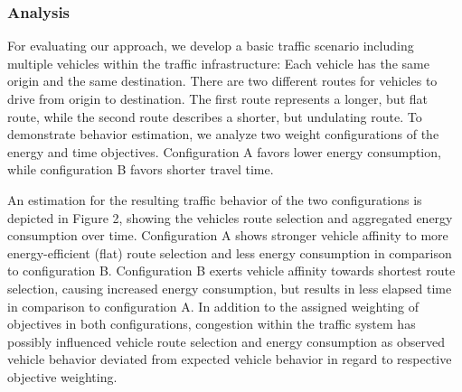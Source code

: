 \documentclass[conference]{../cls/IEEEtran}
\begin{document}
\subsubsection*{Analysis}

For evaluating our approach, we develop a basic traffic scenario
including multiple vehicles within the traffic infrastructure: Each vehicle has
the same origin and the same destination. There are two different
routes for vehicles to drive from origin to destination. The first route
represents a longer, but flat route, while the second route describes a shorter,
but undulating route. To demonstrate behavior estimation, we analyze two weight
configurations of the energy and time objectives. Configuration A favors lower
energy consumption, while configuration B favors shorter travel time.

An estimation for the resulting traffic behavior of the two
configurations is depicted in Figure 2, showing the vehicles route selection
and aggregated energy consumption over time. Configuration A shows
stronger vehicle affinity to more energy-efficient (flat) route selection and
less energy consumption in comparison to configuration B. Configuration B exerts
vehicle affinity towards shortest route selection, causing increased energy
consumption, but results in less elapsed time in comparison to configuration A.
In addition to the assigned weighting of objectives in both configurations,
congestion within the traffic system has possibly influenced vehicle
route selection and energy consumption as observed vehicle behavior deviated
from expected vehicle behavior in regard to respective objective weighting.
\end{document}
